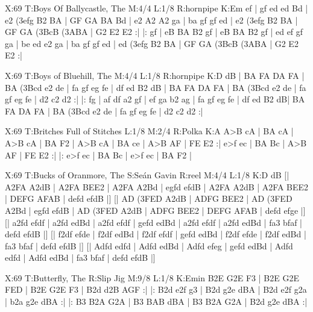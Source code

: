 \documentclass{article}
\begin{document}
\begin{abc}[name]
X:69
T:Boys Of Ballycastle, The
M:4/4
L:1/8
R:hornpipe
K:Em
ef | gf ed ed Bd | e2 (3efg B2 BA | GF GA BA Bd | e2 A2 A2 ga |
ba gf gf ed | e2 (3efg B2 BA | GF GA (3BcB (3ABA | G2 E2 E2 :|
|: gf | eB BA B2 gf | eB BA B2 gf | ed ef gf ga | be ed e2 ga  |
ba gf gf ed | ed (3efg B2 BA | GF GA (3BcB (3ABA | G2 E2 E2 :|
\end{abc}

\begin{abc}[name]
X:69
T:Boys of Bluehill, The
M:4/4
L:1/8
R:hornpipe
K:D
dB | BA FA DA FA | BA (3Bcd e2 de | fa gf eg fe | df ed B2 dB |
BA FA DA FA | BA (3Bcd e2 de | fa gf eg fe | d2 c2 d2 :|
|: fg | af df a2 gf | ef ga b2 ag | fa gf eg fe | df ed B2 dB|
BA FA DA FA | BA (3Bcd e2 de | fa gf eg fe | d2 c2 d2 :|
\end{abc}

\begin{abc}[name]
X:69
T:Britches Full of Stitches
L:1/8
M:2/4
R:Polka
K:A
A>B cA | BA cA | A>B cA | BA F2 |
A>B cA | BA ce | A>B AF | FE E2 :|
e>f ec | BA Bc | A>B AF | FE E2 :|
|: e>f ec | BA Bc | e>f ec | BA F2 |
\end{abc}

\begin{abc}[name]
X:69
T:Bucks of Oranmore, The
S:Seán Gavin
R:reel
M:4/4
L:1/8
K:D
dB [| A2FA A2dB | A2FA BEE2 | A2FA A2Bd | egfd efdB |
A2FA A2dB | A2FA BEE2 | DEFG AFAB | defd efdB |]
[| AD (3FED A2dB | ADFG  BEE2 | AD (3FED A2Bd | egfd efdB |
AD (3FED A2dB | ADFG  BEE2 | DEFG AFAB | defd efge |]
[| a2fd efdf | a2fd edBd | a2fd efdf | gefd edBd |
a2fd efdf | a2fd edBd | fa3 bfaf | defd efdB |]
[| f2df efde | f2df edBd | f2df efdf | gefd edBd |
f2df efde | f2df edBd | fa3 bfaf | defd efdB |]
[| Adfd edfd | Adfd edBd | Adfd efeg | gefd edBd |
Adfd edfd | Adfd edBd | fa3 bfaf | defd efdB |]
\end{abc}

\begin{abc}[name]
X:69
T:Butterfly, The
R:Slip Jig
M:9/8
L:1/8
K:Emin
B2E G2E F3 | B2E G2E FED | B2E G2E F3 | B2d d2B AGF :|
|: B2d e2f g3 | B2d g2e dBA | B2d e2f g2a | b2a g2e dBA :|
|: B3 B2A G2A | B3 BAB dBA | B3 B2A G2A | B2d g2e dBA :|
\end{abc}
\end{document}
